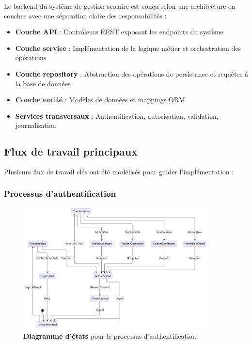 Le backend du système de gestion scolaire est conçu selon une architecture en couches avec une séparation claire des responsabilités :

\begin{itemize}
  \item \textbf{Couche API} : Contrôleurs REST exposant les endpoints du système
  
  \item \textbf{Couche service} : Implémentation de la logique métier et orchestration des opérations
  
  \item \textbf{Couche repository} : Abstraction des opérations de persistance et requêtes à la base de données
  
  \item \textbf{Couche entité} : Modèles de données et mappings ORM
  
  \item \textbf{Services transversaux} : Authentification, autorisation, validation, journalisation
\end{itemize}

\subsection{Flux de travail principaux}

Plusieurs flux de travail clés ont été modélisés pour guider l'implémentation :

\subsubsection{Processus d'authentification}

\begin{figure}[H]
  \centering
  \includegraphics[width=0.9\textwidth,keepaspectratio]{pfe-pics/diagrames/State Diagram (for Authentication Flow).png}
  \caption{\textbf{Diagramme d'états} pour le processus d'authentification.}
  \label{fig:auth_flow}
\end{figure}


